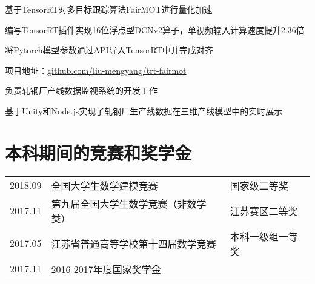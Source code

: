 \documentclass[]{deedy-resume-openfont}
\begin{document}
\begin{minipage}[t]{0.77\textwidth}
	\begin{tightemize}
		\item 基于TensorRT对多目标跟踪算法FairMOT进行量化加速
		\item 编写TensorRT插件实现16位浮点型DCNv2算子，单视频输入计算速度提升2.36倍
		\item 将Pytorch模型参数通过API导入TensorRT中并完成对齐
		\item 项目地址：\href{https://github.com/liu-mengyang/trt-fairmot}{github.com/liu-mengyang/trt-fairmot}
	\end{tightemize}
	\sectionsep

	\begin{tightemize}
		\item 负责轧钢厂产线数据监视系统的开发工作
		\item 基于Unity和Node.js实现了轧钢厂生产线数据在三维产线模型中的实时展示
	\end{tightemize}
	\sectionsep


	\section{本科期间的竞赛和奖学金}
    \begin{tabular}{lll}
        2018.09 & 全国大学生数学建模竞赛 & 国家级二等奖 \\
        2017.11 & 第九届全国大学生数学竞赛（非数学类） & 江苏赛区二等奖 \\
        2017.05 & 江苏省普通高等学校第十四届数学竞赛 & 本科一级组一等奖\\
        2017.11 & 2016-2017年度国家奖学金 & \\
	\end{tabular}
    \sectionsep
\end{minipage}
\end{document}
